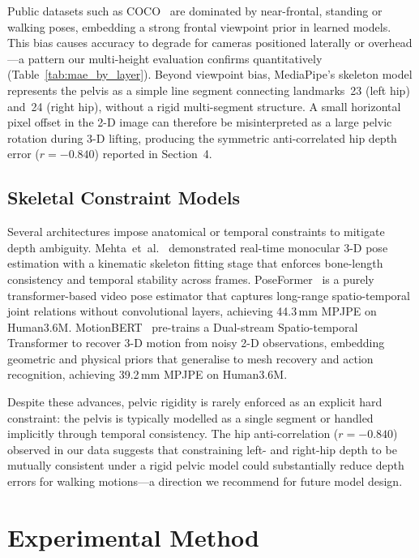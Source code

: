 \documentclass[twocolumn]{article}
\begin{document}
Public datasets such as COCO~\cite{coco} are dominated by near-frontal,
standing or walking poses, embedding a strong frontal viewpoint prior in
learned models. This bias causes accuracy to
degrade for cameras positioned laterally or overhead---a pattern our
multi-height evaluation confirms quantitatively (Table~\ref{tab:mae_by_layer}).
Beyond viewpoint bias, MediaPipe's skeleton model represents the pelvis as a
simple line segment connecting landmarks~23 (left hip) and~24 (right hip),
without a rigid multi-segment structure. A small horizontal pixel offset in
the 2-D image can therefore be misinterpreted as a large pelvic rotation
during 3-D lifting, producing the symmetric anti-correlated hip depth error
($r=-0.840$) reported in Section~4.

\subsection{Skeletal Constraint Models}

Several architectures impose anatomical or temporal constraints to mitigate
depth ambiguity. Mehta~et~al.~\cite{vnect} demonstrated real-time monocular
3-D pose estimation with a kinematic skeleton fitting stage that enforces
bone-length consistency and temporal stability across frames.
PoseFormer~\cite{poseformer} is a purely transformer-based video pose
estimator that captures long-range spatio-temporal joint relations without
convolutional layers, achieving 44.3\,mm MPJPE on Human3.6M.
MotionBERT~\cite{motionbert} pre-trains a Dual-stream Spatio-temporal
Transformer to recover 3-D motion from noisy 2-D observations, embedding
geometric and physical priors that generalise to mesh recovery and action
recognition, achieving 39.2\,mm MPJPE on Human3.6M.

Despite these advances, pelvic rigidity is rarely enforced as an explicit
hard constraint: the pelvis is typically modelled as a single segment or
handled implicitly through temporal consistency. The hip anti-correlation
($r=-0.840$) observed in our data suggests that constraining left- and
right-hip depth to be mutually consistent under a rigid pelvic model could
substantially reduce depth errors for walking motions---a direction we
recommend for future model design.

\section{Experimental Method}
\end{document}
